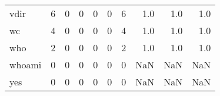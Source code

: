 \begin{tabular}{lrrrrrrrrr}
vdir      &                                       6 &                                                  0 &                                                  0 &                                                  0 &                                                  0 &                                                  6 &                                                1.0 &                                    1.0 &                                  1.0 \\
wc        &                                       4 &                                                  0 &                                                  0 &                                                  0 &                                                  0 &                                                  4 &                                                1.0 &                                    1.0 &                                  1.0 \\
who       &                                       2 &                                                  0 &                                                  0 &                                                  0 &                                                  0 &                                                  2 &                                                1.0 &                                    1.0 &                                  1.0 \\
whoami    &                                       0 &                                                  0 &                                                  0 &                                                  0 &                                                  0 &                                                  0 &                                                NaN &                                    NaN &                                  NaN \\
yes       &                                       0 &                                                  0 &                                                  0 &                                                  0 &                                                  0 &                                                  0 &                                                NaN &                                    NaN &                                  NaN \\
\bottomrule
\end{tabular}
